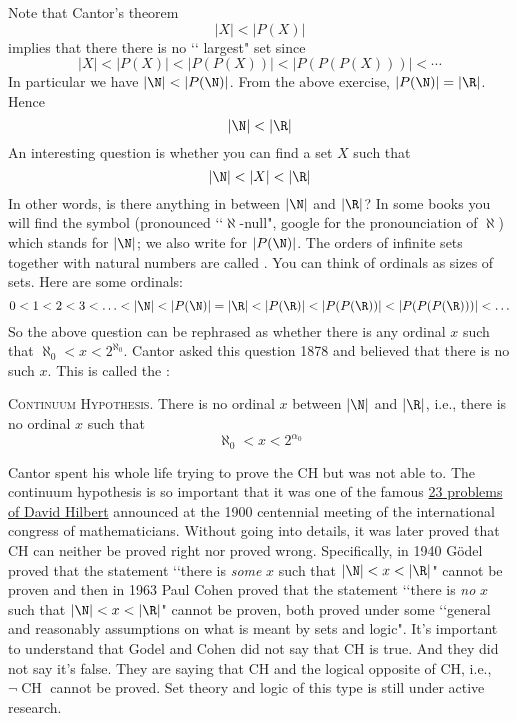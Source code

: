 \newpage
Note that Cantor's theorem
\[
|X| < |P(X)|
\]
implies that there there is no \lq\lq
largest" set since
\[
|X| < |P(X)| < |P(P(X))| < |P(P(P(X)))| < \cdots
\]
In particular we have $|\N| < |P(\N)|$.
From the above exercise, $|P(\N)| = |\R|$.
Hence
\[
|\N| < |\R|
\]
An interesting question is
whether you can find a set $X$ such that
\[
|\N| < |X| < |\R|
\]
In other words, is there anything in between $|\N|$ and $|\R|$?
In some books you will find the symbol
 (pronounced \lq\lq $\aleph$-null", google for the
pronounciation of $\aleph$)
which stands for
$|\N|$; we also write
\sidebarskip{12pt}\sidebarskip{0pt}
for $|P(\N)|$.
The orders of
infinite sets together with natural numbers are called
.
You can think of ordinals as sizes of sets.
Here are some ordinals:
\[
0 < 1 < 2 < 3 < \ldots < |\N| < |P(\N)| = |\R| < |P(\R)| < |P(P(\R))|
< |P(P(P(\R)))|
< \ldots
\]
So the
above question can be rephrased as whether there is any ordinal $x$
such that $\aleph_0 < x < 2^{\aleph_0}$.
Cantor asked this question 1878 and believed that there is no such $x$.
This is called the
\sidebarskip{12pt}\sidebarskip{0pt}:

\textsc{Continuum Hypothesis}.
There is no ordinal $x$ between $|\N|$ and $|\R|$, i.e.,
there is no ordinal $x$ such that
\[
\aleph_0 < x < 2^{\alpha_0}
\]

Cantor spent his whole life trying to prove the CH but was not able to.
The continuum hypothesis is so important that it was
one of the famous
\href{https://en.wikipedia.org/wiki/Hilbert%27s_problems}{23 problems of David Hilbert}
announced at the
1900 centennial meeting of the international congress of mathematicians.
Without going into details, it was later proved that
CH can neither be proved right nor proved wrong.
Specifically, in 1940 G\"odel proved that the statement
\lq\lq there is \textit{some} $x$ such that $|\N| < x < |\R|$"
cannot be proven
and then in 1963 Paul Cohen proved that the statement
\lq\lq there is \textit{no} $x$ such that $|\N| < x < |\R|$"
cannot be proven, both
proved under some \lq\lq general and reasonably assumptions
on what is meant by sets and logic".
It's important to understand that
Godel and Cohen did not say that CH is true.
And they did not say it's false.
They are saying that CH 
and the logical opposite of CH, i.e., $\lnot\operatorname{CH}$ cannot be proved.
Set theory and logic of this type is still under active research.

